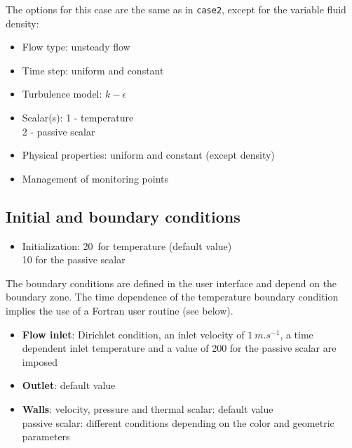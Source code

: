 The options for this case are the same as in \texttt{case2}, except for the variable fluid density:
\begin{itemize}
\renewcommand{\labelitemi}{$\rightarrow$}
        \item Flow type: unsteady flow
        \item Time step: uniform and constant
        \item Turbulence model: $k-\epsilon$
        \item Scalar(s): 1 - temperature\\
      \hspace*{1.6cm} 2 - passive scalar
        \item Physical properties: uniform and constant (except density)
        \item Management of monitoring points
\end{itemize}


        \subsection{Initial and boundary conditions}

\begin{itemize}
\renewcommand{\labelitemi}{$\rightarrow$}
        \item Initialization: 20\degresC\ for temperature (default value) \\
        \hspace*{2.1cm}        10 for the passive scalar
\end{itemize}

The boundary conditions are defined in the user interface and depend on the
boundary zone. The time dependence of the temperature boundary condition implies
the use of a Fortran user routine (see below).

\begin{itemize}
        \item {\bfseries Flow inlet}: Dirichlet condition, an inlet velocity of
$1\ m.s^{-1}$, a time dependent inlet temperature and a value of 200 for the
passive scalar are imposed
        \item {\bfseries Outlet}: default value
        \item {\bfseries Walls}: velocity, pressure and thermal scalar: default value \\
                    \hspace*{1.25cm} passive scalar: different conditions
depending on the color and geometric parameters
\end{itemize}

